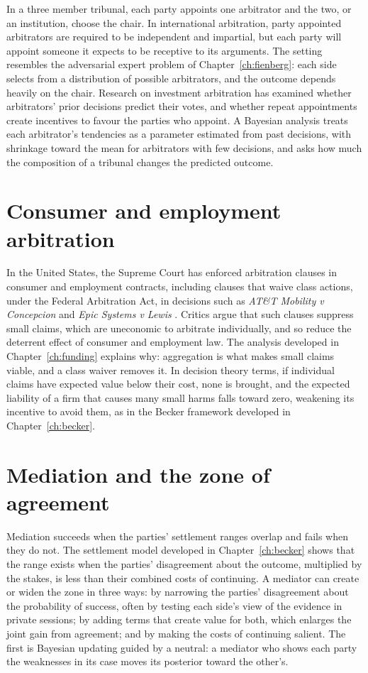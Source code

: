 In a three member tribunal, each party appoints one arbitrator and the two, or an institution, choose the chair. In international arbitration, party appointed arbitrators are required to be independent and impartial, but each party will appoint someone it expects to be receptive to its arguments. The setting resembles the adversarial expert problem of Chapter~\ref{ch:fienberg}: each side selects from a distribution of possible arbitrators, and the outcome depends heavily on the chair. Research on investment arbitration has examined whether arbitrators' prior decisions predict their votes, and whether repeat appointments create incentives to favour the parties who appoint. A Bayesian analysis treats each arbitrator's tendencies as a parameter estimated from past decisions, with shrinkage toward the mean for arbitrators with few decisions, and asks how much the composition of a tribunal changes the predicted outcome.

\section{Consumer and employment arbitration}

In the United States, the Supreme Court has enforced arbitration clauses in consumer and employment contracts, including clauses that waive class actions, under the Federal Arbitration Act, in decisions such as \emph{AT\&T Mobility v Concepcion} and \emph{Epic Systems v Lewis} \citep{concepcion2011,epic2018}. Critics argue that such clauses suppress small claims, which are uneconomic to arbitrate individually, and so reduce the deterrent effect of consumer and employment law. The analysis developed in Chapter~\ref{ch:funding} explains why: aggregation is what makes small claims viable, and a class waiver removes it. In decision theory terms, if individual claims have expected value below their cost, none is brought, and the expected liability of a firm that causes many small harms falls toward zero, weakening its incentive to avoid them, as in the Becker framework developed in Chapter~\ref{ch:becker}.

\section{Mediation and the zone of agreement}

Mediation succeeds when the parties' settlement ranges overlap and fails when they do not. The settlement model developed in Chapter~\ref{ch:becker} shows that the range exists when the parties' disagreement about the outcome, multiplied by the stakes, is less than their combined costs of continuing. A mediator can create or widen the zone in three ways: by narrowing the parties' disagreement about the probability of success, often by testing each side's view of the evidence in private sessions; by adding terms that create value for both, which enlarges the joint gain from agreement; and by making the costs of continuing salient. The first is Bayesian updating guided by a neutral: a mediator who shows each party the weaknesses in its case moves its posterior toward the other's.

